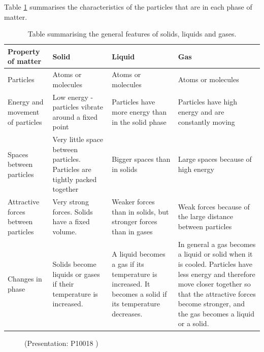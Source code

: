       \label{m38730*id308767}Table \ref{tab:microscopic:kinetic theory} summarises the characteristics of the particles that are in each phase of matter.\par 
\begin{table}[h]
\begin{center}
\caption{Table summarising the general features of solids, liquids and gases.}
\label{tab:microscopic:kinetic theory}
\begin{tabular}{|p{3cm}|p{3cm}|p{3cm}|p{3cm}|}\hline
\textbf{Property of matter} & \textbf{Solid} & \textbf{Liquid} & \textbf{Gas} \\\hline
Particles & Atoms or molecules & Atoms or molecules & Atoms or molecules \\\hline
Energy and movement of particles & Low energy - particles vibrate around a fixed point & Particles have more energy than in the solid phase & Particles have high energy and are constantly moving  \\\hline
Spaces between particles & Very little space between particles. Particles are tightly packed together & Bigger spaces than in solids & Large spaces because of high energy  \\\hline
Attractive forces between particles & Very strong forces. Solids have a fixed volume. & Weaker forces than in solids, but stronger forces than in gases & Weak forces because of the large distance between particles  \\\hline
Changes in phase & Solids become liquids or gases if their temperature is increased. & A liquid becomes a gas if its temperature is increased. It becomes a solid if its temperature decreases. & In general a gas becomes a liquid or solid when it is cooled. Particles have less energy and therefore move closer together so that the attractive forces become stronger, and the gas becomes a liquid or a solid.  \\\hline
\end{tabular}
\end{center}
\end{table}
    \par
    \setcounter{subfigure}{0}
	\begin{figure}[H] %
    \label{m38730*slidesharemedia}\label{m38730*slideshareflash} { (Presentation:  P10018 )}
      \vspace{2pt}
    \vspace{.1in}
 \end{figure}       \par 
